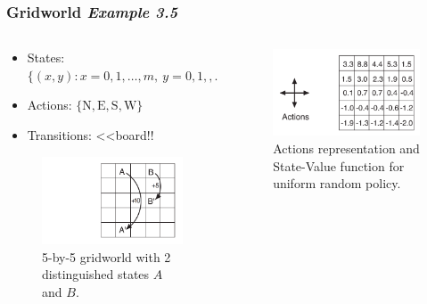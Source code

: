 \documentclass{beamer}
\begin{document}
\begin{frame}
  \frametitle{Gridworld {\em Example 3.5} \cite{Sutton2018}}
  \begin{columns}[T]
    \begin{column}{.5\textwidth}
      \begin{itemize}
      \item States: $\{(x,y): x = 0,1, \ldots, m, \ y = 0,1,, \ldots n\}$
      \item Actions: $\{\text{N}, \text{E}, \text{S}, \text{W}\}$
      \item Transitions: <<board!!
      \end{itemize}
      \begin{figure}
        \label{fig:gridworld-3.5}
        \includegraphics[width=\textwidth]{../images/sutton2018_gridworld3_5.png}
        \caption{5-by-5 gridworld with 2 distinguished states $A$ and $B$.}
      \end{figure}
    \end{column}
    \begin{column}{.5\textwidth}
      \begin{figure}
        \label{fig:gridworld-action-rand-pol}
        \includegraphics[width=\textwidth]{../images/sutton2018_gridworld_rand_pol_val.png}
        \caption{Actions representation and State-Value function for uniform random policy.}
      \end{figure}
    \end{column}
  \end{columns}
\end{frame}
\end{document}
